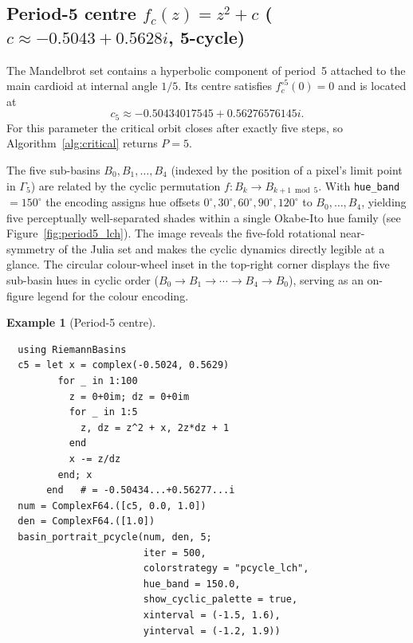 \documentclass[12pt]{article}
\theoremstyle{definition}
\newtheorem{example}[theorem]{Example}
\begin{document}
\subsection{Period-5 centre $f_c(z)=z^2+c$
            ($c\approx-0.5043+0.5628i$, 5-cycle)}
\label{subsec:period5}

The Mandelbrot set contains a hyperbolic component of period~5 attached to
the main cardioid at internal angle $1/5$.  Its centre satisfies
$f_c^{\circ 5}(0)=0$ and is located at
\[
  c_5\approx -0.50434017545 + 0.56276576145i.
\]
For this parameter the critical orbit closes after exactly five steps, so
Algorithm~\ref{alg:critical} returns $P=5$.

The five sub-basins $B_0,B_1,\ldots,B_4$ (indexed by the position of a
pixel's limit point in $\Gamma_5$) are related by the cyclic permutation
$f\colon B_k\to B_{k+1\bmod 5}$.  With \texttt{hue\_band}$=150^\circ$
the encoding assigns hue offsets $0^\circ,30^\circ,60^\circ,90^\circ,
120^\circ$ to $B_0,\ldots,B_4$, yielding five perceptually well-separated
shades within a single Okabe-Ito hue family
(see Figure~\ref{fig:period5_lch}).  The image reveals the five-fold
rotational near-symmetry of the Julia set and makes the cyclic dynamics
directly legible at a glance.  The circular colour-wheel inset in the
top-right corner displays the five sub-basin hues in cyclic order
($B_0\to B_1\to\cdots\to B_4\to B_0$), serving as an on-figure legend
for the colour encoding.

\begin{example}[Period-5 centre]
\begin{verbatim}
  using RiemannBasins
  c5 = let x = complex(-0.5024, 0.5629)
         for _ in 1:100
           z = 0+0im; dz = 0+0im
           for _ in 1:5
             z, dz = z^2 + x, 2z*dz + 1
           end
           x -= z/dz
         end; x
       end   # = -0.50434...+0.56277...i
  num = ComplexF64.([c5, 0.0, 1.0])
  den = ComplexF64.([1.0])
  basin_portrait_pcycle(num, den, 5;
                        iter = 500,
                        colorstrategy = "pcycle_lch",
                        hue_band = 150.0,
                        show_cyclic_palette = true,
                        xinterval = (-1.5, 1.6),
                        yinterval = (-1.2, 1.9))
\end{verbatim}
\end{example}
\end{document}
